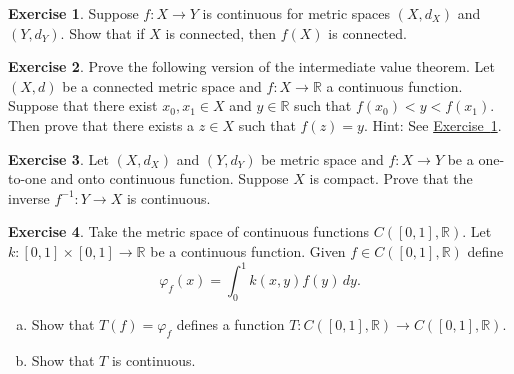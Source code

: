 \documentclass[12pt,openany]{book}
\newcommand{\R}{{\mathbb{R}}}
\newcommand{\myindex}[1]{#1\index{#1}}
\theoremstyle{plain}
\theoremstyle{remark}
\theoremstyle{definition}
\newenvironment{exbox}{%
    \def\FrameCommand{\vrule width 1pt \relax\hspace {10pt}}%
    \MakeFramed {\advance \hsize -\width \FrameRestore }%
}{%
    \endMakeFramed
}
\newenvironment{exparts}{%
    \leavevmode\begin{enumerate}[a),noitemsep,topsep=0pt,parsep=0pt,partopsep=0pt]
}{%
    \end{enumerate}
}
\theoremstyle{exercise}
\newtheorem{exercise}{Exercise}[section]
\theoremstyle{example}
\newcommand{\exerciseref}[1]{\hyperref[#1]{Exercise~\ref*{#1}}}
\begin{document}
\begin{exbox}
\begin{exercise} \label{exercise:msconnconn}
Suppose $f \colon X \to Y$ is continuous for metric spaces $(X,d_X)$
and $(Y,d_Y)$.  Show that if $X$ is connected, then $f(X)$ is connected.
\end{exercise}

\begin{exercise}
Prove the following version of the
intermediate value theorem.  Let $(X,d)$ be a connected
metric space and $f \colon X \to \R$ a continuous function.  Suppose that
there exist $x_0,x_1 \in X$ and $y \in \R$ such that $f(x_0) < y < f(x_1)$.
Then prove that there exists a $z \in X$ such that $f(z) = y$.
Hint: See \exerciseref{exercise:msconnconn}.
\end{exercise}


\begin{exercise}
Let $(X,d_X)$ and $(Y,d_Y)$ be metric space and
$f \colon X \to Y$ be a one-to-one and onto continuous function.  Suppose
$X$ is compact.  Prove that the inverse $f^{-1} \colon Y \to X$
is continuous.
\end{exercise}

\begin{exercise}
Take the metric space of continuous functions $C([0,1],\R)$.  Let
$k \colon [0,1] \times [0,1] \to \R$ be a continuous function.
Given $f \in C([0,1],\R)$ define
\begin{equation*}
\varphi_f(x) = \int_0^1 k(x,y) f(y)  \, dy .
\end{equation*}
\begin{exparts}
\item
Show that $T(f) = \varphi_f$ defines a function $T \colon C([0,1],\R) \to
C([0,1],\R)$.
\item
Show that $T$ is continuous.
\end{exparts}
\end{exercise}


\end{exbox}
\end{document}
